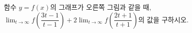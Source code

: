 \noindent\begin{minipage}[t]{0.58\linewidth}\vspace{0pt}\raggedright 함수 $y=f(x)$의 그래프가 오른쪽 그림과 같을 때, $\displaystyle\lim_{t\to\infty} f\left(\dfrac{3t-1}{t-1}\right)+2\lim_{t\to\infty} f\left(\dfrac{2t+1}{t+1}\right)$의 값을 구하시오.\end{minipage}\hfill\begin{minipage}[t]{0.4\linewidth}\vspace{0pt}\centering \resizebox{\ifdim\width>\linewidth\linewidth\else\width\fi}{!}{}\end{minipage}\par
